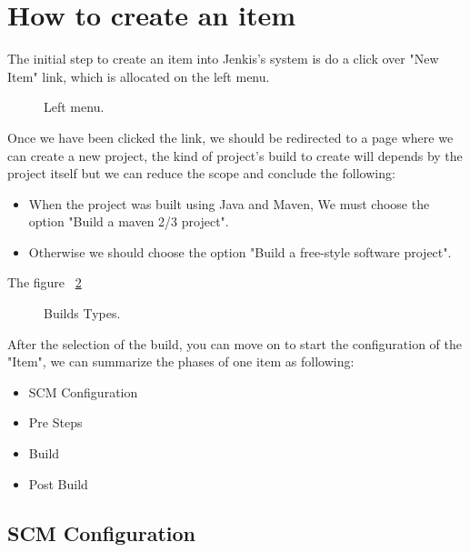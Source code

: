 \documentclass[12pt]{article} %
\begin{document}
\newpage
\section{How to create an item}

The initial step to create an item into Jenkis's system is do a click over "New Item" link, which is allocated on the left menu.

\begin{figure}[H] %
	\caption{Left menu.}
	\label{fig:speciation}
\end{figure}

Once we have been clicked the link, we should be redirected to a page where we can create a new project, the kind of project's build to create will depends by the project itself but we can reduce the scope and conclude the following:

\begin{itemize}
	\item When the project was built using Java and Maven, We must choose the option 
	"Build a maven 2/3 project".
	\item Otherwise we should choose the option "Build a free-style software project".
\end{itemize}

The figure ~\ref{fig:speciation} 

\begin{figure}[H] %
	\caption{Builds Types.}
	\label{fig:speciation}
\end{figure}

After the selection of the build, you can move on to start the configuration of the "Item", we can summarize the phases of one item as following:
\begin{itemize}
	\item SCM Configuration
	\item Pre Steps
	\item Build
	\item Post Build
\end{itemize}

\subsection{SCM Configuration} %
\end{document}

